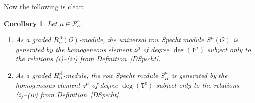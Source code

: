\documentclass[twoside,11pt,reqno]{amsart}
\numberwithin{equation}{section}
\newtheorem{Theorem}[equation]{Theorem}
\newtheorem{Corollary}[equation]{Corollary}
\theoremstyle{definition}  %
\def\bi{\text{\boldmath$i$}}
\newcommand{\St}{\operatorname{St}}
\newcommand{\0}{{\bar 0}}
\newcommand{\1}{{\bar 1}}
\newcommand{\La}{\Lambda}
\newcommand{\al}{\alpha}
\newcommand{\de}{\delta}
\newcommand\Par[1][]{{\mathscr P}^{\kappa#1}}
\def\T{{\mathtt T}}
\def\RPar{{\mathscr{RP}}^\kappa}
\renewcommand\O{\mathcal O}
\begin{document}
Now the following is clear:

\begin{Corollary} %
Let $\mu\in\Par_\al$. 
\begin{enumerate}
\item[{\rm (i)}] As a graded $R_\al^\La(\O)$-module, the universal row Specht module $S^\mu(\O)$ is generated by the homogeneous element $z^\mu$ of degree $\deg(\T^\mu)$ subject only to the relations (i)--(iv) from Definition~\ref{DSpecht}. 
\item[{\rm (ii)}] As a graded  $H_\al^\La$-module, the row Specht module $S^\mu_H$ is generated  by the homogeneous element $z^\mu$ of degree $\deg(\T^\mu)$ subject only to the relations (i)--(iv) from Definition~\ref{DSpecht}. 
\end{enumerate}
\end{Corollary}

\end{document}
